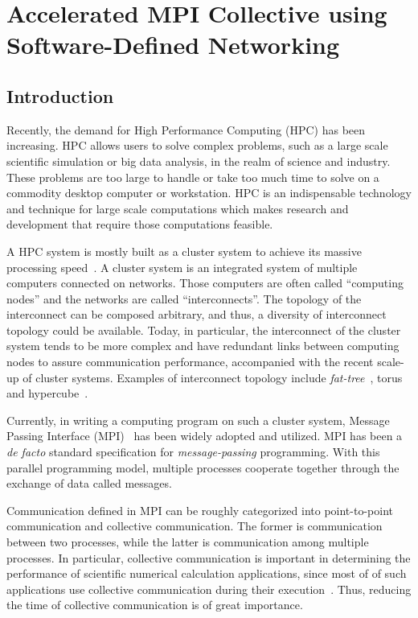 \chapter{Accelerated MPI Collective using Software-Defined Networking}\label{sec:iii}

\section{Introduction}\label{sec:iii-introduction}

Recently, the demand for High Performance Computing (HPC) has been
increasing. HPC allows users to solve complex problems, such as a large
scale scientific simulation or big data analysis, in the realm of
science and industry. These problems are too large to handle or take too
much time to solve on a commodity desktop computer or workstation. HPC
is an indispensable technology and technique for large scale
computations which makes research and development that require those
computations feasible.

A HPC system is mostly built as a cluster system to achieve its massive
processing speed~\autocite{top500}. A cluster system is an integrated system
of multiple computers connected on networks. Those computers are often
called ``computing nodes'' and the networks are called
``interconnects''. The topology of the interconnect can be composed
arbitrary, and thus, a diversity of interconnect topology could be
available. Today, in particular, the interconnect of the cluster system
tends to be more complex and have redundant links between computing
nodes to assure communication performance, accompanied with the recent
scale-up of cluster systems. Examples of interconnect topology include
\emph{fat-tree}~\autocite{Leiserson1985},
torus~\autocite{Alverson2010,Ajima2012} and hypercube~\autocite{Dally2003}.

Currently, in writing a computing program on such a cluster system, Message
Passing Interface (MPI)~\autocite{Gropp2014,MessagePassingInterfaceForum2015} has
been widely adopted and utilized. MPI has been a \emph{de facto} standard
specification for \emph{message-passing} programming. With this parallel
programming model, multiple processes cooperate together through the exchange
of data called messages.

Communication defined in MPI can be roughly categorized into
point-to-point communication and collective communication. The former is
communication between two processes, while the latter is communication
among multiple processes. In particular, collective communication is
important in determining the performance of scientific numerical
calculation applications, since most of of such applications use
collective communication during their execution~\autocite{Rabenseifner2000}.
Thus, reducing the time of collective communication is of great
importance.

